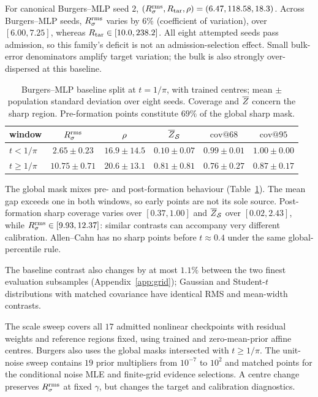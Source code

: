 For canonical Burgers--MLP seed $2$, $(R_{\sigma}^{\mathrm{rms}},R_{\mathrm{tar}},\rho)=(6.47,118.58,18.3)$.
Across Burgers--MLP seeds, $R_{\sigma}^{\mathrm{rms}}$ varies by $6\%$ (coefficient of variation), over
$[6.00,7.25]$, whereas $R_{\mathrm{tar}}\in[10.0,238.2]$. All eight attempted seeds pass admission,
so this family's deficit is not an admission-selection effect. Small bulk-error denominators
amplify target variation; the bulk is also strongly over-dispersed at this baseline.

\begin{table}[t]
\centering\small


\begin{tabular}{@{}lccccc@{}}
\toprule
window & $R_{\sigma}^{\mathrm{rms}}$ & $\rho$ & $\overline{Z}_{\mathcal S}$ & $\mathrm{cov}@68$ & $\mathrm{cov}@95$ \\
\midrule
$t<1/\pi$ & $2.65\pm0.23$ & $16.9\pm14.5$ & $0.10\pm0.07$ & $0.99\pm0.01$ & $1.00\pm0.00$ \\
$t\ge1/\pi$ & $10.75\pm0.71$ & $20.6\pm13.1$ & $0.81\pm0.81$ & $0.76\pm0.27$ & $0.87\pm0.17$ \\
\bottomrule
\end{tabular}
\caption{Burgers--MLP baseline split at $t=1/\pi$, with trained centres; mean $\pm$
population standard deviation over eight seeds. Coverage and $\overline{Z}$ concern the sharp
region. Pre-formation points constitute $69\%$ of the global sharp mask.}
\label{tab:temporal}
\end{table}

The global mask mixes pre- and post-formation behaviour (Table~\ref{tab:temporal}).
The mean gap exceeds one in both windows, so early points are not its sole source.
Post-formation sharp coverage varies over $[0.37,1.00]$ and $\overline{Z}_{\mathcal S}$ over
$[0.02,2.43]$, while $R_{\sigma}^{\mathrm{rms}}\in[9.93,12.37]$: similar contrasts can accompany very
different calibration. Allen--Cahn has no sharp points before $t\approx0.4$ under the
same global-percentile rule.

The baseline contrast also changes by at most $1.1\%$ between the two finest evaluation subsamples
(Appendix~\ref{app:grid}); Gaussian and Student-$t$ distributions with matched covariance
have identical RMS and mean-width contrasts.

The scale sweep covers all $17$ admitted nonlinear checkpoints with residual weights
and reference regions fixed, using trained and zero-mean-prior affine centres. Burgers also uses
the global masks intersected with $t\ge1/\pi$. The unit-noise
sweep contains $19$ prior multipliers from $10^{-7}$ to $10^2$ and matched points for the
conditional noise MLE and finite-grid evidence selections. A centre change preserves
$R_{\sigma}^{\mathrm{rms}}$ at fixed $\gamma$, but changes the target and calibration diagnostics.


